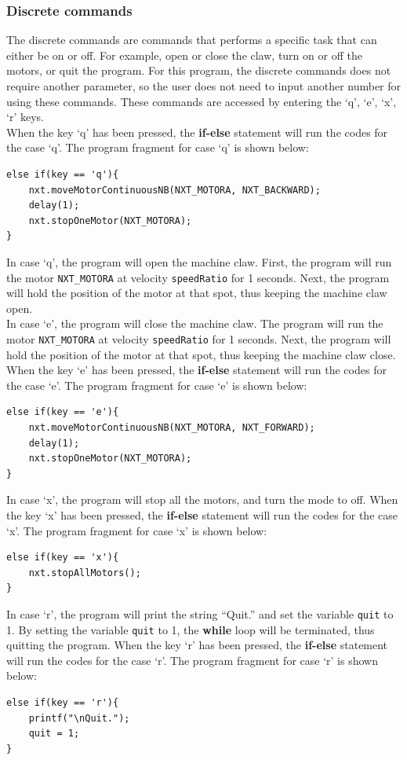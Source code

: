 \documentclass[11pt]{article}
\begin{document}
\subsubsection*{Discrete commands}
The discrete commands are commands that performs a specific task that can either 
be on or off. For example, open or close the claw, turn on or off the motors, or 
quit the program. For this program, the discrete commands does not require another 
parameter, so the user does not need to input another number for using these 
commands. These commands are accessed by entering the `q', `e', `x', `r' keys.\\
When the key `q' has been pressed, the {\bf if-else} statement will run 
the codes for the case `q'. The program fragment for case `q' is shown below:
\begin{lstlisting}
else if(key == 'q'){
    nxt.moveMotorContinuousNB(NXT_MOTORA, NXT_BACKWARD);
    delay(1);
    nxt.stopOneMotor(NXT_MOTORA);
}
\end{lstlisting}
In case `q', the program will open the machine claw. First, the program will run 
the motor {\tt NXT\_MOTORA} at velocity {\tt speedRatio} for 1 seconds. Next, 
the program will hold the position of the motor at that spot, thus keeping the 
machine claw open. \\
In case `e', the program will close the machine claw. The program will run the 
motor {\tt NXT\_MOTORA} at velocity {\tt speedRatio} for 1 seconds. Next, the 
program will hold the position of the motor at that spot, thus keeping the 
machine claw close.\\

When the key `e' has been pressed, the {\bf if-else} statement will run 
the codes for the case `e'. The program fragment for case `e' is shown below:
\begin{lstlisting}
else if(key == 'e'){
    nxt.moveMotorContinuousNB(NXT_MOTORA, NXT_FORWARD);
    delay(1);
    nxt.stopOneMotor(NXT_MOTORA);
}
\end{lstlisting}
In case `x', the program will stop all the motors, and turn the mode to off. 
When the key `x' has been pressed, the {\bf if-else} statement will run the 
codes for the case `x'. The program fragment for case `x' is shown below:
\begin{lstlisting}
else if(key == 'x'){
    nxt.stopAllMotors();
}
\end{lstlisting}
In case `r', the program will print the string ``Quit.'' and set the variable 
{\tt quit} to 1. By setting the variable {\tt quit} to 1, the {\bf while} loop 
will be terminated, thus quitting the program. When the key `r' has been pressed, 
the {\bf if-else} statement will run the codes for the case `r'. The program 
fragment for case `r' is shown below:
\begin{lstlisting}
else if(key == 'r'){
    printf("\nQuit.");
    quit = 1;
}
\end{lstlisting}
\end{document}
